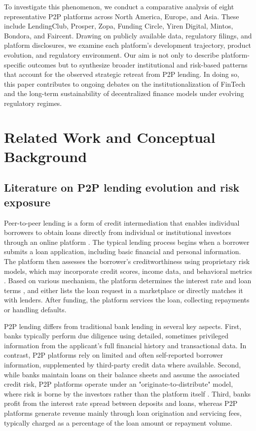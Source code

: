 \documentclass[pdflatex,sn-apa]{sn-jnl}%
\theoremstyle{thmstyleone}%
\theoremstyle{thmstyletwo}%
\theoremstyle{thmstylethree}%
\begin{document}
To investigate this phenomenon, we conduct a comparative analysis of eight representative P2P platforms across North America, Europe, and Asia. These include LendingClub, Prosper, Zopa, Funding Circle, Yiren Digital, Mintos, Bondora, and Faircent. Drawing on publicly available data, regulatory filings, and platform disclosures, we examine each platform's development trajectory, product evolution, and regulatory environment. Our aim is not only to describe platform-specific outcomes but to synthesize broader institutional and risk-based patterns that account for the observed strategic retreat from P2P lending. In doing so, this paper contributes to ongoing debates on the institutionalization of FinTech and the long-term sustainability of decentralized finance models under evolving regulatory regimes.


\section{Related Work and Conceptual Background}\label{sec2}
\subsection{Literature on P2P lending evolution and risk exposure}\label{sec2.1}
Peer-to-peer lending is a form of credit intermediation that enables individual borrowers to obtain loans directly from individual or institutional investors through an online platform \citep{eid_bridging_2024}. The typical lending process begins when a borrower submits a loan application, including basic financial and personal information. The platform then assesses the borrower's creditworthiness using proprietary risk models, which may incorporate credit scores, income data, and behavioral metrics \citep{liu_leveraging_2024}. Based on various mechanism, the platform determines the interest rate and loan terms \citep{zhou_bilateral_2019,shen_empirical_2021}, and either lists the loan request in a marketplace or directly matches it with lenders. After funding, the platform services the loan, collecting repayments or handling defaults.

P2P lending differs from traditional bank lending in several key aspects. First, banks typically perform due diligence using detailed, sometimes privileged information from the applicant's full financial history and transactional data. In contrast, P2P platforms rely on limited and often self-reported borrower information, supplemented by third-party credit data where available. Second, while banks maintain loans on their balance sheets and assume the associated credit risk, P2P platforms operate under an "originate-to-distribute" model, where risk is borne by the investors rather than the platform itself \citep{freedman_information_2017, lin_judging_2013}. Third, banks profit from the interest rate spread between deposits and loans, whereas P2P platforms generate revenue mainly through loan origination and servicing fees, typically charged as a percentage of the loan amount or repayment volume.
\end{document}

